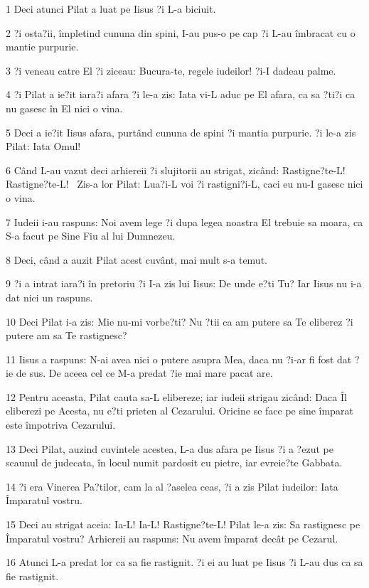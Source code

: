 \par 1 Deci atunci Pilat a luat pe Iisus ?i L-a biciuit.
\par 2 ?i osta?ii, împletind cununa din spini, I-au pus-o pe cap ?i L-au îmbracat cu o mantie purpurie.
\par 3 ?i veneau catre El ?i ziceau: Bucura-te, regele iudeilor! ?i-I dadeau palme.
\par 4 ?i Pilat a ie?it iara?i afara ?i le-a zis: Iata vi-L aduc pe El afara, ca sa ?ti?i ca nu gasesc în El nici o vina.
\par 5 Deci a ie?it Iisus afara, purtând cununa de spini ?i mantia purpurie. ?i le-a zis Pilat: Iata Omul!
\par 6 Când L-au vazut deci arhiereii ?i slujitorii au strigat, zicând: Rastigne?te-L! Rastigne?te-L!  Zis-a lor Pilat: Lua?i-L voi ?i rastigni?i-L, caci eu nu-I gasesc nici o vina.
\par 7 Iudeii i-au raspuns: Noi avem lege ?i dupa legea noastra El trebuie sa moara, ca S-a facut pe Sine Fiu al lui Dumnezeu.
\par 8 Deci, când a auzit Pilat acest cuvânt, mai mult s-a temut.
\par 9 ?i a intrat iara?i în pretoriu ?i I-a zis lui Iisus: De unde e?ti Tu? Iar Iisus nu i-a dat nici un raspuns.
\par 10 Deci Pilat i-a zis: Mie nu-mi vorbe?ti? Nu ?tii ca am putere sa Te eliberez ?i putere am sa Te rastignesc?
\par 11 Iisus a raspuns: N-ai avea nici o putere asupra Mea, daca nu ?i-ar fi fost dat ?ie de sus. De aceea cel ce M-a predat ?ie mai mare pacat are.
\par 12 Pentru aceasta, Pilat cauta sa-L elibereze; iar iudeii strigau zicând: Daca Îl eliberezi pe Acesta, nu e?ti prieten al Cezarului. Oricine se face pe sine împarat este împotriva Cezarului.
\par 13 Deci Pilat, auzind cuvintele acestea, L-a dus afara pe Iisus ?i a ?ezut pe scaunul de judecata, în locul numit pardosit cu pietre, iar evreie?te Gabbata.
\par 14 ?i era Vinerea Pa?tilor, cam la al ?aselea ceas, ?i a zis Pilat iudeilor: Iata Împaratul vostru.
\par 15 Deci au strigat aceia: Ia-L! Ia-L! Rastigne?te-L! Pilat le-a zis: Sa rastignesc pe Împaratul vostru? Arhiereii au raspuns: Nu avem împarat decât pe Cezarul.
\par 16 Atunci L-a predat lor ca sa fie rastignit. ?i ei au luat pe Iisus ?i L-au dus ca sa fie rastignit.
